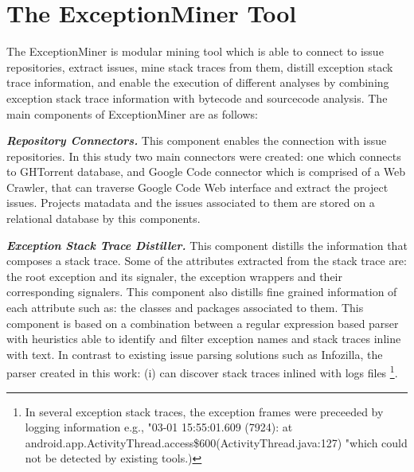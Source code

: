 \documentclass[conference]{IEEEtran}
\begin{document}
\section{The ExceptionMiner Tool}
\label{sec:exceptionminer}

The ExceptionMiner is modular mining tool which is able to connect to issue repositories, 
extract issues, mine stack traces from them, distill exception stack trace information,
and enable the execution of different analyses by combining exception stack 
trace information with bytecode and sourcecode analysis. The main components of ExceptionMiner are as follows:

\emph{\textbf{Repository Connectors.}} This component enables the connection 
with issue repositories. In this study two main connectors were created: one which connects to 
GHTorrent database, and Google Code connector which is comprised of a Web Crawler,
 that can traverse Google Code Web interface and extract the project issues. 
Projects matadata and the issues associated to them are stored on a relational 
database by this components.

\emph{\textbf{Exception Stack Trace Distiller.}}
This component distills the information that composes a stack trace.
 Some of the attributes extracted from the stack trace are:
 the root exception and its signaler, the exception wrappers and their corresponding signalers. 
This component also distills fine grained information of each attribute such as: the classes and packages associated to them.
This component is based on a combination between a regular expression based parser 
with heuristics able to identify and filter exception names and stack traces inline with text. 
In contrast to existing issue parsing solutions such as Infozilla, the parser
created in this work: (i) can discover stack traces inlined with logs files \footnote{In several 
exception stack traces, the exception frames were preceeded by logging information e.g., 
"03-01 15:55:01.609 (7924): at android.app.ActivityThread.access\$600(ActivityThread.java:127) 
"which could not be detected by existing tools.)}.


\end{document}
